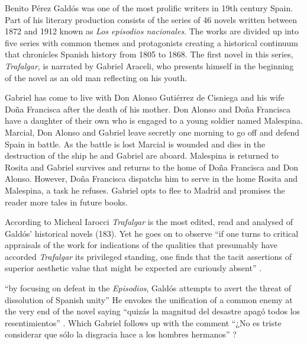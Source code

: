 \documentclass[12pt]{report}
\begin{document}
Benito Pérez Galdós was one of the most prolific writers in 19th century Spain. 
Part of his literary production consists of the series of 46 novels written between 1872 and 1912 known as \textit{Los episodios nacionales}.
The works are divided up into five series with common themes and protagonists creating a historical continuum that chronicles Spanish history from 1805 to 1868.
The first novel in this series, \textit{Trafalgar}, is narrated by Gabriel Araceli, who presents himself in the beginning of the novel as an old man reflecting on his youth.

Gabriel has come to live with Don Alonso Gutiérrez de Cisniega and his wife Doña Francisca after the death of his mother.
Don Alonso and Doña Francisca have a daughter of their own who is engaged to a young soldier named Malespina.
Marcial, Don Alonso and Gabriel leave secretly one morning to go off and defend Spain in battle.
As the battle is lost Marcial is wounded and dies in the destruction of the ship he and Gabriel are aboard.
Malespina is returned to Rosita and Gabriel survives and returns to the home of Doña Francisca and Don Alonso.
However, Doña Francisca dispatchs him to serve in the home Rosita and Malespina, a task he refuses.
Gabriel opts to flee to Madrid and promises the reader more tales in future books.


According to Micheal Iarocci \textit{Trafalgar} is the most edited, read and analysed of Galdós' historical novels (183)\nocite{Iarocci2003}.
Yet he goes on to observe \enquote{if one turns to critical appraisals of the work for indications of the qualities that presumably have accorded \textit{Trafalgar} its privileged standing, one finds that the tacit assertions of superior aesthetic value that might be expected are curiously absent} \cite[183]{Iarocci2003}.

\enquote{by focusing on defeat in the \textit{Episodios}, Galdós attempts to avert the threat of dissolution of Spanish unity} \cite[12]{Kempen2007}
He envokes the unification of a common enemy at the very end of the novel saying \enquote{quizás la magnitud del desastre apagó todos los resentimientos} \autocite[2099]{Galdos1882}.
Which Gabriel follows up with the comment \enquote{¿No es triste considerar que sólo la disgracia hace a los hombres hermanos} \autocite[2099]{Galdos1882}?
\end{document}
